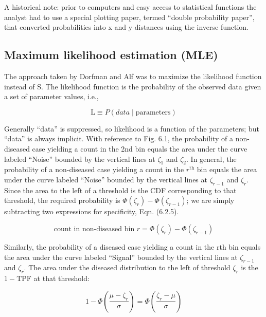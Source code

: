 \documentclass[
]{book}
\begin{document}
A historical note: prior to computers and easy access to statistical functions the analyst had to use a special plotting paper, termed ``double probability paper'', that converted probabilities into x and y distances using the inverse function.

\hypertarget{maximum-likelihood-estimation-mle}{%
\subsection{Maximum likelihood estimation (MLE)}\label{maximum-likelihood-estimation-mle}}

The approach taken by Dorfman and Alf was to maximize the likelihood function instead of S. The likelihood function is the probability of the observed data given a set of parameter values, i.e.,

\begin{equation*} 
\text {L} \equiv P\left ( data \mid \text {parameters} \right )
\end{equation*}

Generally ``data'' is suppressed, so likelihood is a function of the parameters; but ``data'' is always implicit. With reference to Fig. 6.1, the probability of a non-diseased case yielding a count in the 2nd bin equals the area under the curve labeled ``Noise'' bounded by the vertical lines at \(\zeta_1\) and \(\zeta_2\). In general, the probability of a non-diseased case yielding a count in the \(r^\text{th}\) bin equals the area under the curve labeled ``Noise'' bounded by the vertical lines at \(\zeta_{r-1}\) and \(\zeta_r\). Since the area to the left of a threshold is the CDF corresponding to that threshold, the required probability is \(\Phi\left ( \zeta_r \right ) - \Phi\left ( \zeta_{r-1} \right )\); we are simply subtracting two expressions for specificity, Eqn. (6.2.5).

\begin{equation*} 
\text {count in non-diseased bin } r = \Phi\left ( \zeta_r \right ) - \Phi\left ( \zeta_{r-1} \right )
\end{equation*}

Similarly, the probability of a diseased case yielding a count in the rth bin equals the area under the curve labeled ``Signal'' bounded by the vertical lines at \(\zeta_{r-1}\) and \(\zeta_r\). The area under the diseased distribution to the left of threshold \(\zeta_r\) is the \(1 - \text{TPF}\) at that threshold:

\begin{equation*} 
1 - \Phi\left ( \frac{\mu-\zeta_r}{\sigma} \right ) = \Phi\left ( \frac{\zeta_r - \mu}{\sigma} \right )
\end{equation*}
\end{document}

